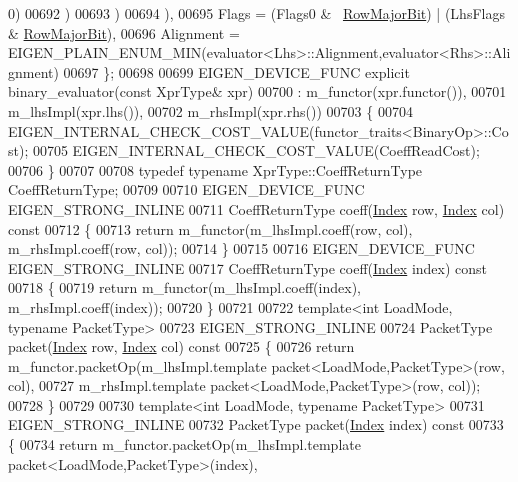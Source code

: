 \begin{DoxyCode}
      0)
00692            )
00693         )
00694      ),
00695     Flags = (Flags0 & ~\hyperlink{group__flags_gae4f56c2a60bbe4bd2e44c5b19cbe8762}{RowMajorBit}) | (LhsFlags & \hyperlink{group__flags_gae4f56c2a60bbe4bd2e44c5b19cbe8762}{RowMajorBit}),
00696     Alignment = EIGEN\_PLAIN\_ENUM\_MIN(evaluator<Lhs>::Alignment,evaluator<Rhs>::Alignment)
00697   \};
00698 
00699   EIGEN\_DEVICE\_FUNC \textcolor{keyword}{explicit} binary\_evaluator(\textcolor{keyword}{const} XprType& xpr)
00700     : m\_functor(xpr.functor()),
00701       m\_lhsImpl(xpr.lhs()), 
00702       m\_rhsImpl(xpr.rhs())  
00703   \{
00704     EIGEN\_INTERNAL\_CHECK\_COST\_VALUE(functor\_traits<BinaryOp>::Cost);
00705     EIGEN\_INTERNAL\_CHECK\_COST\_VALUE(CoeffReadCost);
00706   \}
00707 
00708   \textcolor{keyword}{typedef} \textcolor{keyword}{typename} XprType::CoeffReturnType CoeffReturnType;
00709 
00710   EIGEN\_DEVICE\_FUNC EIGEN\_STRONG\_INLINE
00711   CoeffReturnType coeff(\hyperlink{namespace_eigen_a62e77e0933482dafde8fe197d9a2cfde}{Index} row, \hyperlink{namespace_eigen_a62e77e0933482dafde8fe197d9a2cfde}{Index} col)\textcolor{keyword}{ const}
00712 \textcolor{keyword}{  }\{
00713     \textcolor{keywordflow}{return} m\_functor(m\_lhsImpl.coeff(row, col), m\_rhsImpl.coeff(row, col));
00714   \}
00715 
00716   EIGEN\_DEVICE\_FUNC EIGEN\_STRONG\_INLINE
00717   CoeffReturnType coeff(\hyperlink{namespace_eigen_a62e77e0933482dafde8fe197d9a2cfde}{Index} index)\textcolor{keyword}{ const}
00718 \textcolor{keyword}{  }\{
00719     \textcolor{keywordflow}{return} m\_functor(m\_lhsImpl.coeff(index), m\_rhsImpl.coeff(index));
00720   \}
00721 
00722   \textcolor{keyword}{template}<\textcolor{keywordtype}{int} LoadMode, \textcolor{keyword}{typename} PacketType>
00723   EIGEN\_STRONG\_INLINE
00724   PacketType packet(\hyperlink{namespace_eigen_a62e77e0933482dafde8fe197d9a2cfde}{Index} row, \hyperlink{namespace_eigen_a62e77e0933482dafde8fe197d9a2cfde}{Index} col)\textcolor{keyword}{ const}
00725 \textcolor{keyword}{  }\{
00726     \textcolor{keywordflow}{return} m\_functor.packetOp(m\_lhsImpl.template packet<LoadMode,PacketType>(row, col),
00727                               m\_rhsImpl.template packet<LoadMode,PacketType>(row, col));
00728   \}
00729 
00730   \textcolor{keyword}{template}<\textcolor{keywordtype}{int} LoadMode, \textcolor{keyword}{typename} PacketType>
00731   EIGEN\_STRONG\_INLINE
00732   PacketType packet(\hyperlink{namespace_eigen_a62e77e0933482dafde8fe197d9a2cfde}{Index} index)\textcolor{keyword}{ const}
00733 \textcolor{keyword}{  }\{
00734     \textcolor{keywordflow}{return} m\_functor.packetOp(m\_lhsImpl.template packet<LoadMode,PacketType>(index),

\end{DoxyCode}
